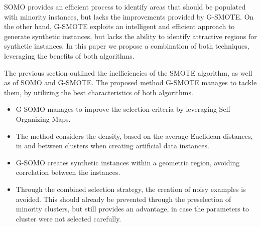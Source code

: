 \documentclass[parskip=full]{scrartcl}
\begin{document}
SOMO provides an efficient process to identify areas that should be populated with minority instances, but lacks the improvements provided by G-SMOTE. On the other hand, G-SMOTE exploits an intelligent and efficient approach to generate synthetic instances, but lacks the ability to identify attractive regions for synthetic instances. In this paper we propose a combination of both techniques, leveraging the benefits of both algorithms. 


The previous section outlined the inefficiencies of the SMOTE algorithm, as well as of SOMO and G-SMOTE. The proposed method G-SMOTE manages to tackle them, by utilizing the best characteristics of both algorithms. 

\begin{itemize} 
\item G-SOMO  manages to improve the selection criteria by leveraging Self-Organizing Maps.
\item The method considers the density, based on the average Euclidean distances, in and between clusters when creating artificial data instances.
\item G-SOMO creates synthetic instances within a geometric region, avoiding correlation between the instances.
\item Through the combined selection strategy, the creation of noisy examples is avoided. This should already be prevented through the preselection of minority clusters, but still provides an advantage, in case the parameters to cluster were not selected carefully.
\end{itemize}
\end{document}
